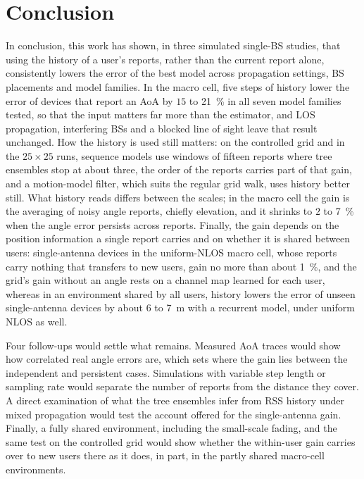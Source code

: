\section{Conclusion}
\label{sec:conclusion}

In conclusion, this work has shown, in three simulated single-BS studies, that using the history of a user's reports, rather than the current report alone, consistently lowers the error of the best model across propagation settings, BS placements and model families. In the macro cell, five steps of history lower the error of devices that report an AoA by $15$ to \SI{21}{\percent} in all seven model families tested, so that the input matters far more than the estimator, and LOS propagation, interfering BSs and a blocked line of sight leave that result unchanged. How the history is used still matters: on the controlled grid and in the $25\times25$ runs, sequence models use windows of fifteen reports where tree ensembles stop at about three, the order of the reports carries part of that gain, and a motion-model filter, which suits the regular grid walk, uses history better still. What history reads differs between the scales; in the macro cell the gain is the averaging of noisy angle reports, chiefly elevation, and it shrinks to $2$ to \SI{7}{\percent} when the angle error persists across reports. Finally, the gain depends on the position information a single report carries and on whether it is shared between users: single-antenna devices in the uniform-NLOS macro cell, whose reports carry nothing that transfers to new users, gain no more than about \SI{1}{\percent}, and the grid's gain without an angle rests on a channel map learned for each user, whereas in an environment shared by all users, history lowers the error of unseen single-antenna devices by about $6$ to \SI{7}{\meter} with a recurrent model, under uniform NLOS as well.

Four follow-ups would settle what remains. Measured AoA traces would show how correlated real angle errors are, which sets where the gain lies between the independent and persistent cases. Simulations with variable step length or sampling rate would separate the number of reports from the distance they cover. A direct examination of what the tree ensembles infer from RSS history under mixed propagation would test the account offered for the single-antenna gain. Finally, a fully shared environment, including the small-scale fading, and the same test on the controlled grid would show whether the within-user gain carries over to new users there as it does, in part, in the partly shared macro-cell environments.
